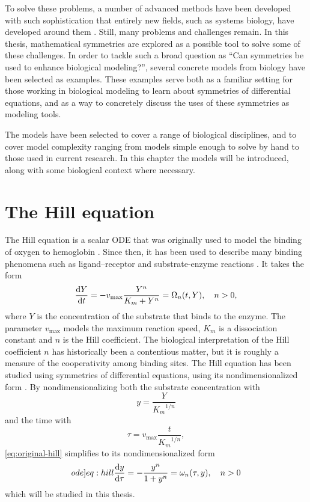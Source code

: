 To solve these problems, a number of advanced methods have been developed with such sophistication that entirely new fields, such as systems biology, have developed around them \cite{kitano2002systems,westerhoff2004evolution}.
Still, many problems and challenges remain.
In this thesis, mathematical symmetries are explored as a possible tool to solve some of these challenges.
In order to tackle such a broad question as \enquote{Can symmetries be used to enhance biological modeling?}, several concrete models from biology have been selected as examples.
These examples serve both as a familiar setting for those working in biological modeling to learn about symmetries of differential equations, and as a way to concretely discuss the uses of these symmetries as modeling tools.

The models have been selected to cover a range of biological disciplines, and to cover model complexity ranging from models simple enough to solve by hand to those used in current research.
In this chapter the models will be introduced, along with some biological context where necessary.

\section{The Hill equation}

The Hill equation is a scalar ODE that was originally used to model the binding of oxygen to hemoglobin \cite{hill1913combinations}.
Since then, it has been used to describe many binding phenomena such as ligand--receptor and substrate-enzyme reactions \cite{weiss1997hill}.
It takes the form
\begin{equation} \label{eq:original-hill}
  \diff{Y}{t} = - v_\text{max} \frac{Y^n}{K_m + Y^n} = \Omega_n(t, Y), \quad
  n > 0,
\end{equation}
where \(Y\) is the concentration of the substrate that binds to the enzyme.
The parameter \(v_\text{max}\) models the maximum reaction speed, \(K_m\) is a dissociation constant and \(n\) is the Hill coefficient.
The biological interpretation of the Hill coefficient \(n\) has historically been a contentious matter, but it is roughly a measure of the cooperativity among binding sites.
The Hill equation has been studied using symmetries of differential equations, using its nondimensionalized form \cite{ohlsson2020symmetry}.
By nondimensionalizing both the substrate concentration with
\begin{equation*}
  y = \frac{Y}{{K_m}^{1/n}}
\end{equation*}
and the time with
\begin{equation*}
  \tau = v_\text{max} \frac{t}{{K_m}^{1/n}},
\end{equation*}
\cref{eq:original-hill} simplifies to its nondimensionalized form
\begin{equation} \label[ode]{eq:hill}
  \diff{y}{\tau} = - \frac{y^n}{1 + y^n} = \omega_n(\tau, y), \quad
  n > 0
\end{equation}
which will be studied in this thesis.

